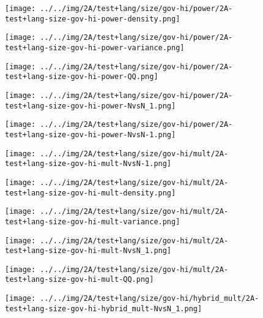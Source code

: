 \begin{figure}[H]
\centering	\texttt{[image: ../../img/2A/test+lang/size/gov-hi/power/2A-test+lang-size-gov-hi-power-density.png]}
\end{figure}
\begin{figure}[H]
\centering	\texttt{[image: ../../img/2A/test+lang/size/gov-hi/power/2A-test+lang-size-gov-hi-power-variance.png]}
\end{figure}
\begin{figure}[H]
\centering	\texttt{[image: ../../img/2A/test+lang/size/gov-hi/power/2A-test+lang-size-gov-hi-power-QQ.png]}
\end{figure}
\begin{figure}[H]
\centering	\texttt{[image: ../../img/2A/test+lang/size/gov-hi/power/2A-test+lang-size-gov-hi-power-NvsN\_1.png]}
\end{figure}
\begin{figure}[H]
\centering	\texttt{[image: ../../img/2A/test+lang/size/gov-hi/power/2A-test+lang-size-gov-hi-power-NvsN-1.png]}
\end{figure}
\begin{figure}[H]
\centering	\texttt{[image: ../../img/2A/test+lang/size/gov-hi/mult/2A-test+lang-size-gov-hi-mult-NvsN-1.png]}
\end{figure}
\begin{figure}[H]
\centering	\texttt{[image: ../../img/2A/test+lang/size/gov-hi/mult/2A-test+lang-size-gov-hi-mult-density.png]}
\end{figure}
\begin{figure}[H]
\centering	\texttt{[image: ../../img/2A/test+lang/size/gov-hi/mult/2A-test+lang-size-gov-hi-mult-variance.png]}
\end{figure}
\begin{figure}[H]
\centering	\texttt{[image: ../../img/2A/test+lang/size/gov-hi/mult/2A-test+lang-size-gov-hi-mult-NvsN\_1.png]}
\end{figure}
\begin{figure}[H]
\centering	\texttt{[image: ../../img/2A/test+lang/size/gov-hi/mult/2A-test+lang-size-gov-hi-mult-QQ.png]}
\end{figure}
\begin{figure}[H]
\centering	\texttt{[image: ../../img/2A/test+lang/size/gov-hi/hybrid\_mult/2A-test+lang-size-gov-hi-hybrid\_mult-NvsN\_1.png]}
\end{figure}
